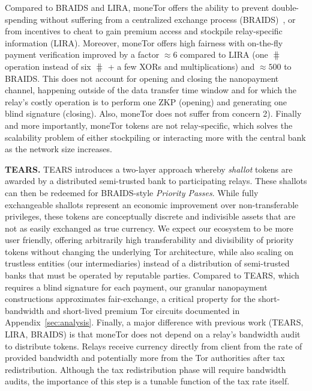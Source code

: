 Compared to BRAIDS and LIRA, moneTor offers the ability to prevent double-spending without suffering from a centralized exchange process (BRAIDS)~\cite{jansenblogpost}, or from incentives to cheat to gain premium access and stockpile relay-specific information (LIRA).
Moreover, moneTor offers high fairness with on-the-fly payment verification improved by a factor $\approx 6$ compared to LIRA (one $\hash$ operation instead of six $\hash$ + a few XORs and multiplications) and $\approx 500$ to BRAIDS.
This does not account for opening and closing the nanopayment channel, happening outside of the data transfer time window and for which the relay's costly operation is to perform one ZKP (opening) and generating one blind signature (closing).
Also, moneTor does not suffer from concern 2).
Finally and more importantly, moneTor tokens are not relay-specific, which solves the scalability problem of either stockpiling or interacting more with the central bank as the network size increases.

\medskip\noindent\textbf{TEARS.}
TEARS introduces a two-layer approach whereby \emph{shallot} tokens are awarded by a distributed semi-trusted bank to participating relays.
These shallots can then be redeemed for BRAIDS-style \emph{Priority Passes}.
While fully exchangeable shallots represent an economic improvement over non-transferable privileges, these tokens are conceptually discrete and indivisible assets that are not as easily exchanged as true currency.
We expect our ecosystem to be more user friendly, offering arbitrarily high transferability and divisibility of priority tokens without changing the underlying Tor architecture, while also scaling on trustless entities (our intermediaries) instead of a distribution of semi-trusted banks that must be operated by reputable parties.
Compared to TEARS, which requires a blind signature for each payment, our granular nanopayment constructions approximates fair-exchange, a critical property for the short-bandwidth and short-lived premium Tor circuits documented in Appendix~\ref{sec:analysis}.
Finally, a major difference with previous work (TEARS, LIRA, BRAIDS) is that moneTor does not depend on a relay's bandwidth audit to distribute tokens.
Relays receive currency directly from client from the rate of provided bandwidth and potentially more from the Tor authorities after tax redistribution.
Although the tax redistribution phase will require bandwidth audits, the importance of this step is a tunable function of the tax rate itself.

